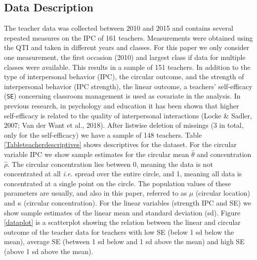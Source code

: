 \documentclass[man,mask]{apa6}
\DeclareRobustCommand{\VANDER}[3]{#2}
\begin{document}
\vspace{-0.75cm}
\subsection{Data Description}\label{DataDescriptives}
\vspace{-0.75cm}

The teacher data was collected between 2010 and 2015 and contains several
repeated measures on the IPC of 161 teachers. Measurements were obtained using
the QTI and taken in different years and classes. For this paper we only
consider one measurement, the first occasion (2010) and largest class if data
for multiple classes were available. This results in a sample of 151 teachers.
In addition to the type of interpersonal behavior (IPC), the circular outcome,
and the strength of interpersonal behavior (IPC strength), the linear outcome, a
teachers' self-efficacy (\verb|SE|) concerning classroom management is used as
covariate in the analysis. In previous research, in psychology and education it
has been shown that higher self-efficacy is related to the quality of
interpersonal interactions (Locke \& Sadler, 2007; \VANDER{Want}{Van der}{van der} Want et al., 2018).
After listwise deletion of missings (\(3\) in total, only for the self-efficacy)
we have a sample of 148 teachers. Table \ref{Tableteacherdescriptives} shows
descriptives for the dataset. For the circular variable IPC we show sample
estimates for the circular mean \(\bar{\theta}\) and concentration \(\hat{\rho}\).
The circular concentration lies between 0, meaning the data is not concentrated
at all \emph{i.e.} spread over the entire circle, and 1, meaning all data is
concentrated at a single point on the circle. The population values of these
parameters are usually, and also in this paper, referred to as \(\mu\) (circular
location) and \(\kappa\) (circular concentration). For the linear variables
(strength IPC and SE) we show sample estimates of the linear mean and standard
deviation (sd). Figure \ref{dataplot} is a scatterplot showing the relation between
the linear and circular outcome of the teacher data for teachers with low SE
(below 1 sd below the mean), average SE (between 1 sd below and 1 sd above the
mean) and high SE (above 1 sd above the mean).
\end{document}
